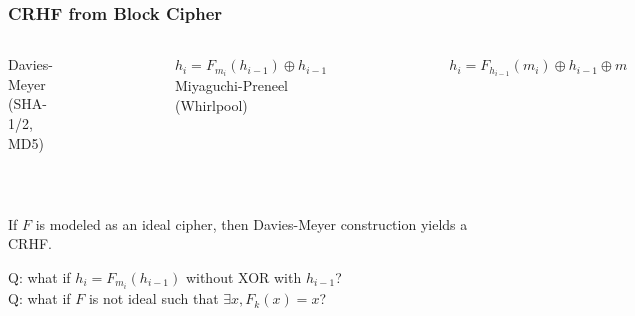 \begin{frame}\frametitle{CRHF from Block Cipher}
\begin{columns}
Davies-Meyer (SHA-1/2, MD5)
\begin{figure}
\begin{center}

\end{center}
\end{figure}
$h_{i} = F_{m_{i}}(h_{i-1}) \oplus h_{i-1}$
Miyaguchi-Preneel (Whirlpool)
\begin{figure}
\begin{center}

\end{center}
\end{figure}
$h_{i} = F_{h_{i-1}}(m_{i}) \oplus h_{i-1} \oplus m$
\end{columns}
$\quad$\\
\begin{theorem}
If $F$ is modeled as an ideal cipher, then Davies-Meyer construction yields a CRHF.
\end{theorem}
\alert{Q: what if $h_{i} = F_{m_{i}}(h_{i-1})$ without XOR with $h_{i-1}$? }\\
\alert{Q: what if $F$ is not ideal such that $\exists x, F_k(x)=x$?}
\end{frame}
